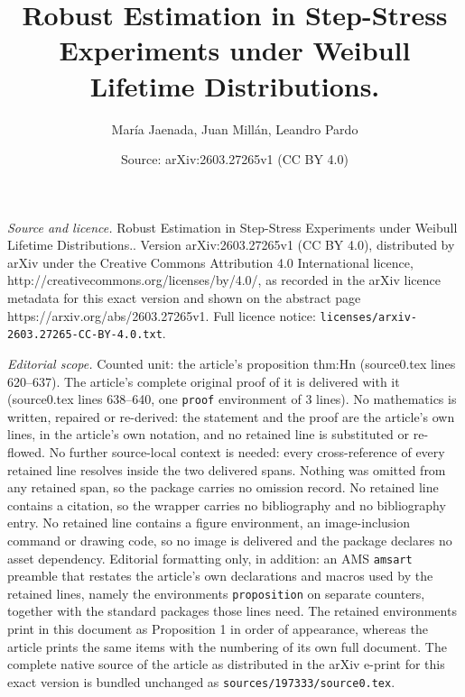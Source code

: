 \documentclass[10pt,a4paper]{amsart}
\title{Robust Estimation in Step-Stress Experiments under Weibull Lifetime Distributions.}
\author{Mar\'ia Jaenada, Juan Mill\'an, Leandro Pardo}
\date{Source: arXiv:2603.27265v1 (CC BY 4.0)}
\begin{document}
\maketitle

\noindent\emph{Source and licence.} Robust Estimation in Step-Stress Experiments under Weibull Lifetime Distributions.. Version arXiv:2603.27265v1 (CC BY 4.0), distributed by arXiv under the Creative Commons Attribution 4.0 International licence, http://creativecommons.org/licenses/by/4.0/, as recorded in the arXiv licence metadata for this exact version and shown on the abstract page https://arxiv.org/abs/2603.27265v1. Full licence notice: \texttt{licenses/arxiv-2603.27265-CC-BY-4.0.txt}.\par\smallskip

\noindent\textit{Editorial scope.} Counted unit: the article's proposition thm:Hn (source0.tex lines 620--637). The article's complete original proof of it is delivered with it (source0.tex lines 638--640, one \texttt{proof} environment of 3 lines). No mathematics is written, repaired or re-derived: the statement and the proof are the article's own lines, in the article's own notation, and no retained line is substituted or re-flowed.  No further source-local context is needed: every cross-reference of every retained line resolves inside the two delivered spans.  Nothing was omitted from any retained span, so the package carries no omission record.  No retained line contains a citation, so the wrapper carries no bibliography and no bibliography entry.  No retained line contains a figure environment, an image-inclusion command or drawing code, so no image is delivered and the package declares no asset dependency.  Editorial formatting only, in addition: an AMS \texttt{amsart} preamble that restates the article's own declarations and macros used by the retained lines, namely the environments \texttt{proposition} on separate counters, together with the standard packages those lines need.  The retained environments print in this document as Proposition 1 in order of appearance, whereas the article prints the same items with the numbering of its own full document.  The complete native source of the article as distributed in the arXiv e-print for this exact version is bundled unchanged as \texttt{sources/197333/source0.tex}.
\end{document}
